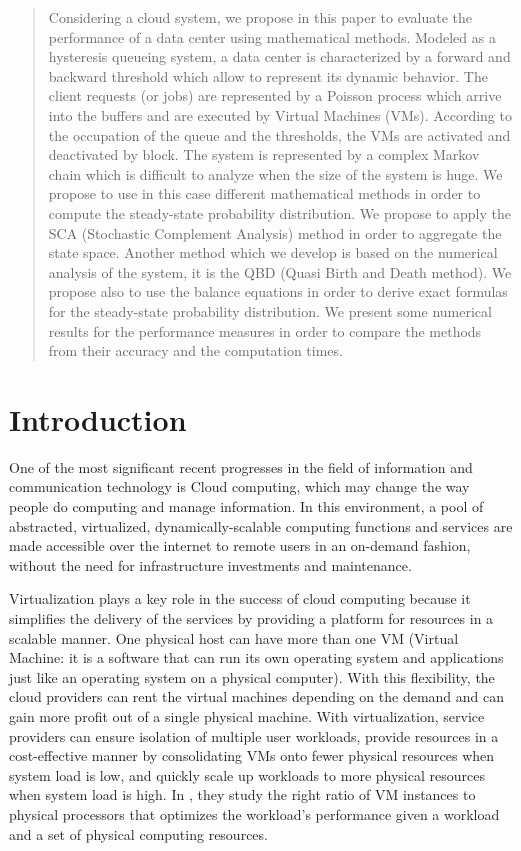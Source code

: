 \documentclass[conference]{IEEEtran}
\begin{document}
\begin{abstract}
Considering a cloud system, we propose in this paper to evaluate the performance of a data center using mathematical methods. Modeled as a hysteresis 
queueing system, a data center is characterized by a forward and backward threshold which allow to represent its dynamic behavior.
The client requests (or jobs) are represented by a Poisson process which arrive into the buffers and are executed by Virtual Machines (VMs). 
According to the occupation of  the queue and the thresholds, the VMs are activated  and deactivated by block. The system is represented by a complex 
Markov chain which  is difficult to analyze when the size of the system is huge. We propose to use in this case different mathematical methods in 
order to compute the steady-state probability distribution. We propose to apply  the SCA (Stochastic Complement Analysis) method in order to aggregate 
the state space. Another method which we develop is based on the numerical analysis of the system, it is the QBD (Quasi Birth and Death method).  
We propose also to use the balance equations in order to derive exact formulas for the steady-state probability distribution.
We present some numerical results for the performance measures in order to compare the  methods from their accuracy and the computation times.
\end{abstract}


\section{Introduction}

One of the most significant recent progresses in the field of information and communication technology is Cloud computing, which may
change the way people do computing and manage information. In this environment, a pool of abstracted, virtualized, dynamically-scalable
computing functions and services   are made accessible over the internet to remote users in an on-demand fashion, without the need for  
infrastructure investments and maintenance.

Virtualization plays a key role in the success of cloud computing because it simplifies the delivery of the services by providing a platform for 
resources in a scalable manner.   One physical host can have  more than one VM (Virtual Machine: it is a software that can run its own operating system
and applications just like an operating system on a physical computer). With this flexibility, the cloud providers can rent the virtual machines 
depending on the demand and  can gain more profit out of a single physical machine. With virtualization, service providers can ensure isolation of 
multiple user workloads, provide resources in a cost-effective manner by consolidating VMs onto fewer physical resources when system load is low, 
and quickly scale up workloads to more physical resources when system load is high. In \cite{WHV10}, they study the right ratio of VM instances to 
physical processors that optimizes the workload's performance given a workload and a set of physical computing resources.
\end{document}
